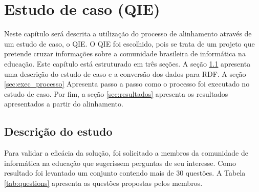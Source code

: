 \chapter{Estudo de caso (QIE)}
\label{cap:estudo}
Neste capítulo será descrita a utilização do processo de alinhamento através de um estudo de caso, o QIE. O QIE foi escolhido, pois se trata de um projeto que pretende cruzar informações sobre a comunidade brasileira de informática na educação. Este capítulo está estruturado em três seções. A seção \ref{sec:estudo_descricao} apresenta uma descrição do estudo de caso e a conversão dos dados para RDF. A seção \ref{sec:exec_processo} Apresenta passo a passo como o processo foi executado no estudo de caso. Por fim, a seção \ref{sec:resultados} apresenta os resultados apresentados a partir do alinhamento.

\section{Descrição do estudo}
\label{sec:estudo_descricao}
Para validar a eficácia da solução, foi solicitado a membros da comunidade de informática na educação que sugerissem perguntas de seu interesse. Como resultado foi levantado um conjunto contendo mais de 30 questões. A Tabela \ref{tab:questions} apresenta as questões propostas pelos membros.

